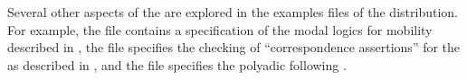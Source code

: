 Several other aspects of the \pc{} are explored in the examples files of
the distribution.  For example, the file  contains
a specification of the modal logics for mobility described in
\cite{milner93tcs}, the file  specifies the
checking of ``correspondence assertions'' for the \pc{} as described in
\cite{gordon03tcs}, and the file  specifies the
polyadic \pc{} following \cite{milner99book}.
